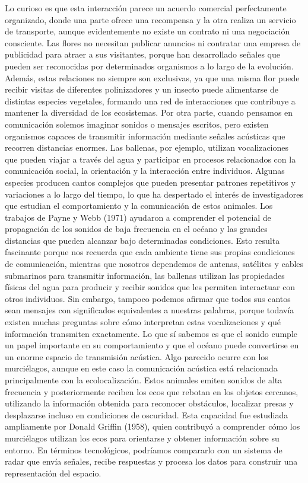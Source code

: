 \documentclass[12pt]{article}
\begin{document}
Lo curioso es que esta interacción parece un acuerdo comercial perfectamente organizado, donde una parte ofrece una recompensa y la otra realiza un servicio de transporte, aunque evidentemente no existe un contrato ni una negociación consciente. Las flores no necesitan publicar anuncios ni contratar una empresa de publicidad para atraer a sus visitantes, porque han desarrollado señales que pueden ser reconocidas por determinados organismos a lo largo de la evolución. Además, estas relaciones no siempre son exclusivas, ya que una misma flor puede recibir visitas de diferentes polinizadores y un insecto puede alimentarse de distintas especies vegetales, formando una red de interacciones que contribuye a mantener la diversidad de los ecosistemas.
Por otra parte, cuando pensamos en comunicación solemos imaginar sonidos o mensajes escritos, pero existen organismos capaces de transmitir información mediante señales acústicas que recorren distancias enormes. Las ballenas, por ejemplo, utilizan vocalizaciones que pueden viajar a través del agua y participar en procesos relacionados con la comunicación social, la orientación y la interacción entre individuos. Algunas especies producen cantos complejos que pueden presentar patrones repetitivos y variaciones a lo largo del tiempo, lo que ha despertado el interés de investigadores que estudian el comportamiento y la comunicación de estos animales. Los trabajos de Payne y Webb (1971) ayudaron a comprender el potencial de propagación de los sonidos de baja frecuencia en el océano y las grandes distancias que pueden alcanzar bajo determinadas condiciones.
Esto resulta fascinante porque nos recuerda que cada ambiente tiene sus propias condiciones de comunicación, mientras que nosotros dependemos de antenas, satélites y cables submarinos para transmitir información, las ballenas utilizan las propiedades físicas del agua para producir y recibir sonidos que les permiten interactuar con otros individuos. Sin embargo, tampoco podemos afirmar que todos sus cantos sean mensajes con significados equivalentes a nuestras palabras, porque todavía existen muchas preguntas sobre cómo interpretan estas vocalizaciones y qué información transmiten exactamente. Lo que sí sabemos es que el sonido cumple un papel importante en su comportamiento y que el océano puede convertirse en un enorme espacio de transmisión acústica.
Algo parecido ocurre con los murciélagos, aunque en este caso la comunicación acústica está relacionada principalmente con la ecolocalización. Estos animales emiten sonidos de alta frecuencia y posteriormente reciben los ecos que rebotan en los objetos cercanos, utilizando la información obtenida para reconocer obstáculos, localizar presas y desplazarse incluso en condiciones de oscuridad. Esta capacidad fue estudiada ampliamente por Donald Griffin (1958), quien contribuyó a comprender cómo los murciélagos utilizan los ecos para orientarse y obtener información sobre su entorno. En términos tecnológicos, podríamos compararlo con un sistema de radar que envía señales, recibe respuestas y procesa los datos para construir una representación del espacio.
\end{document}
